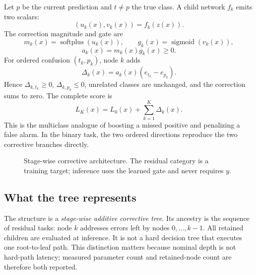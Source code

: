 \documentclass[11pt,a4paper]{article}
\begin{document}
Let \(p\) be the current prediction and \(t\ne p\) the true class. A child
network \(f_k\) emits two scalars:
\[
(u_k(x),v_k(x))=f_k(z(x)).
\]
The correction magnitude and gate are
\[
m_k(x)=\operatorname{softplus}(u_k(x)),\qquad
g_k(x)=\operatorname{sigmoid}(v_k(x)),
\]
\[
a_k(x)=m_k(x)g_k(x)\ge0.
\]
For ordered confusion \((t_k,p_k)\), node \(k\) adds
\[
\Delta_k(x)=a_k(x)(e_{t_k}-e_{p_k}).
\]
Hence \(\Delta_{k,t_k}\ge0\), \(\Delta_{k,p_k}\le0\), unrelated classes are
unchanged, and the correction sums to zero. The complete score is
\[
L_K(x)=L_0(x)+\sum_{k=1}^{K}\Delta_k(x).
\]
This is the multiclass analogue of boosting a missed positive and penalizing a
false alarm. In the binary task, the two ordered directions reproduce the two
corrective branches directly.

\begin{figure}[t]
\centering
{}
\caption{Stage-wise corrective architecture. The residual category is a
training target; inference uses the learned gate and never requires \(y\).}
\label{fig:architecture}
\end{figure}

\subsection{What the tree represents}

The structure is a \emph{stage-wise additive corrective tree}. Its ancestry is
the sequence of residual tasks: node \(k\) addresses errors left by nodes
\(0,\ldots,k-1\). All retained children are evaluated at inference. It is not a
hard decision tree that executes one root-to-leaf path. This distinction matters
because nominal depth is not hard-path latency; measured parameter count and
retained-node count are therefore both reported.
\end{document}

